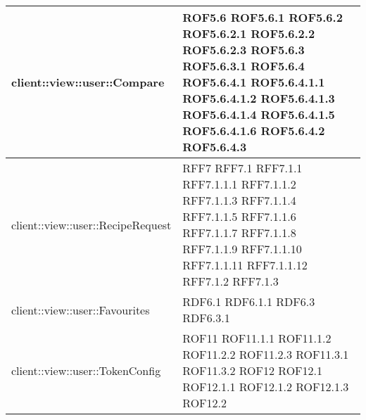 \begin{center}
\begin{longtable}{| p{11cm} | p{2.5cm} |}
\hline
client::view::user::Compare & ROF5.6 \newline ROF5.6.1 \newline ROF5.6.2 \newline ROF5.6.2.1 \newline ROF5.6.2.2 \newline ROF5.6.2.3 \newline ROF5.6.3 \newline ROF5.6.3.1 \newline ROF5.6.4 \newline ROF5.6.4.1 \newline ROF5.6.4.1.1 \newline ROF5.6.4.1.2 \newline ROF5.6.4.1.3 \newline ROF5.6.4.1.4 \newline ROF5.6.4.1.5 \newline ROF5.6.4.1.6 \newline ROF5.6.4.2 \newline ROF5.6.4.3 \\
\hline
client::view::user::RecipeRequest & RFF7 \newline RFF7.1 \newline RFF7.1.1 \newline RFF7.1.1.1 \newline RFF7.1.1.2 \newline RFF7.1.1.3 \newline RFF7.1.1.4 \newline RFF7.1.1.5 \newline RFF7.1.1.6 \newline RFF7.1.1.7 \newline RFF7.1.1.8 \newline RFF7.1.1.9 \newline RFF7.1.1.10 \newline RFF7.1.1.11 \newline RFF7.1.1.12 \newline RFF7.1.2 \newline RFF7.1.3 \\
\hline
client::view::user::Favourites & RDF6.1 \newline RDF6.1.1 \newline RDF6.3 \newline RDF6.3.1 \\
\hline
client::view::user::TokenConfig & ROF11 \newline ROF11.1.1 \newline ROF11.1.2 \newline ROF11.2.2 \newline ROF11.2.3 \newline ROF11.3.1 \newline ROF11.3.2 \newline ROF12 \newline ROF12.1 \newline ROF12.1.1 \newline ROF12.1.2 \newline ROF12.1.3 \newline ROF12.2 \\

\end{longtable}
\end{center}
